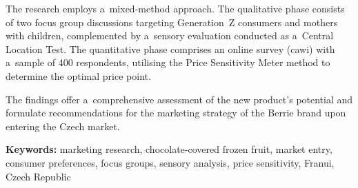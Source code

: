 The research employs a~mixed-method approach. The qualitative phase consists of two focus group discussions targeting Generation~Z consumers and mothers with children, complemented by a~sensory evaluation conducted as a~Central Location Test. The quantitative phase comprises an online survey (\gls{cawi}) with a~sample of 400 respondents, utilising the Price Sensitivity Meter method to determine the optimal price point.

The findings offer a~comprehensive assessment of the new product's potential and formulate recommendations for the marketing strategy of the Berrie brand upon entering the Czech market.

\vspace{5mm}
\noindent\textbf{Keywords:} marketing research, chocolate-covered frozen fruit, market entry, consumer preferences, focus groups, sensory analysis, price sensitivity, Franui, Czech Republic

\newpage
